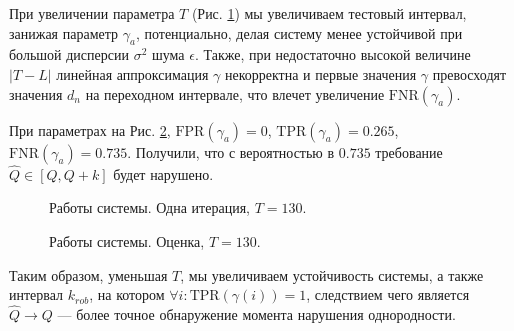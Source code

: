 \documentclass[specialist, substylefile = spbu.rtx,
			   subf, href, 12pt]{disser}
\begin{document}
\newpage
При увеличении параметра $ T $ (Рис. \ref{pic:system_estimation_one_iter_t=130}) мы увеличиваем тестовый интервал, занижая параметр $ \gamma_a $, потенциально, делая систему менее устойчивой при большой дисперсии $ \sigma^2 $ шума $ \epsilon $. Также, при недостаточно высокой величине $ |T - L| $ линейная аппроксимация $ \gamma $ некорректна и первые значения $ \gamma $ превосходят значения $ d_n $ на переходном интервале, что влечет увеличение $ \mathrm{FNR}(\gamma_a) $.

При параметрах на Рис. \ref{pic:system_estimation_t=130}, $ \mathrm{FPR}(\gamma_a) = 0 $, $ \mathrm{TPR}(\gamma_a) = 0.265 $, $ \mathrm{FNR}(\gamma_a) = 0.735 $. Получили, что с вероятностью в $ 0.735 $ требование $ \hat{Q} \in [Q, Q+k] $ будет нарушено.


\begin{figure}[!hhh]
	\caption{Работы системы. Одна итерация, $ T = 130 $.}
	\label{pic:system_estimation_one_iter_t=130}
\end{figure}

\begin{figure}[!hhh]
	\caption{Работы системы. Оценка, $ T = 130 $.}
	\label{pic:system_estimation_t=130}
\end{figure}

\newpage
Таким образом, уменьшая $ T $, мы увеличиваем устойчивость системы, а также интервал $ k_{rob} $, на котором $ \forall i: \mathrm{TPR}(\gamma(i)) = 1 $, следствием чего является $ \hat{Q} \rightarrow Q $ --- более точное обнаружение момента нарушения однородности.
\end{document}
